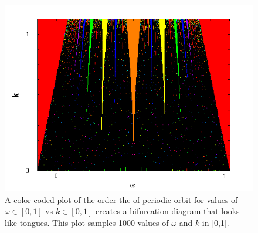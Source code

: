 \begin{figure}[!h]
\caption[The Arnold Tongues for the deterministic circle map]{A color coded
  plot of the order the of periodic orbit for values of $\omega \in [0,1]$ vs $k \in [0,1]$ creates a bifurcation diagram that looks
  like tongues. This plot samples 1000 values of $\omega$ and $k$ in [0,1].}\label{fig:dettongues}
	\begin{center}
		\includegraphics[scale=0.7]{figs/tongues_1000_det.png}
	\end{center}
\end{figure}
